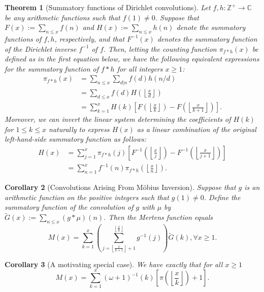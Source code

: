 \documentclass[11pt,reqno,a4letter]{article}
\numberwithin{figure}{section}
\numberwithin{table}{section}
\newcommand{\floor}[1]{\left\lfloor #1 \right\rfloor}
\newcommand{\Floor}[2]{\ensuremath{\left\lfloor \frac{#1}{#2} \right\rfloor}}
\theoremstyle{plain}
\newtheorem{theorem}{Theorem}
\newtheorem{cor}[theorem]{Corollary}
\numberwithin{theorem}{section}
\theoremstyle{definition}
\begin{document}
\begin{theorem}[Summatory functions of Dirichlet convolutions] 
\label{theorem_SummatoryFuncsOfDirCvls} 
Let $f,h: \mathbb{Z}^{+} \rightarrow \mathbb{C}$ be any arithmetic functions such that $f(1) \neq 0$. 
Suppose that $F(x) := \sum_{n \leq x} f(n)$ and $H(x) := \sum_{n \leq x} h(n)$ denote the summatory 
functions of $f,h$, respectively, and that $F^{-1}(x)$ denotes the summatory function of the 
Dirichlet inverse $f^{-1}$ of $f$. Then, letting the counting function $\pi_{f \ast h}(x)$ be defined 
as in the first equation below, we have the following equivalent expressions for the 
summatory function of $f \ast h$ for all integers $x \geq 1$: 
\begin{align*} 
\pi_{f \ast h}(x) & = \sum_{n \leq x} \sum_{d|n} f(d) h(n/d) \\ 
     & = \sum_{d \leq x} f(d) H\left(\Floor{x}{d}\right) \\ 
     & = \sum_{k=1}^{x} H(k) \left[F\left(\Floor{x}{k}\right) - 
     F\left(\Floor{x}{k+1}\right)\right]. 
\end{align*} 
Moreover, we can invert the linear system determining the coefficients of $H(k)$ for $1 \leq k \leq x$ 
naturally to express $H(x)$ as a linear combination of the original left-hand-side 
summatory function as follows:
\begin{align*} 
H(x) & = \sum_{j=1}^{x} \pi_{f \ast h}(j) \left[F^{-1}\left(\Floor{x}{j}\right) - 
     F^{-1}\left(\Floor{x}{j+1}\right)\right] \\ 
     & = \sum_{n=1}^{x} f^{-1}(n) \pi_{f \ast h}\left(\Floor{x}{n}\right). 
\end{align*} 
\end{theorem} 

\begin{cor}[Convolutions Arising From M\"obius Inversion] 
\label{cor_CvlGAstMu} 
Suppose that $g$ is an arithmetic function on the positive integers such that 
$g(1) \neq 0$. Define the summatory function of 
the convolution of $g$ with $\mu$ by $\widetilde{G}(x) := \sum_{n \leq x} (g \ast \mu)(n)$. 
Then the Mertens function equals 
\[
M(x) = \sum_{k=1}^{x} \left(\sum_{j=\floor{\frac{x}{k+1}}+1}^{\floor{\frac{x}{k}}} g^{-1}(j)\right) 
     \widetilde{G}(k), \forall x \geq 1. 
\]
\end{cor} 

\begin{cor}[A motivating special case] 
\label{cor_Mx_gInvnPixk_formula} 
We have exactly that for all $x \geq 1$ 
\begin{equation} 
\label{eqn_Mx_gInvnPixk_formula} 
M(x) = \sum_{k=1}^{x} (\omega+1)^{-1}(k) \left[\pi\left(\Floor{x}{k}\right) + 1\right]. 
\end{equation} 
\end{cor} 
\end{document}

